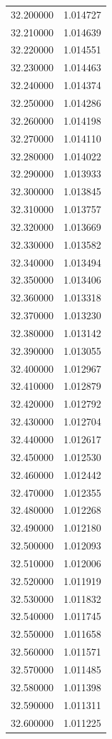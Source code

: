 \begin{tabular}{rr}
32.200000 & 1.014727 \\
32.210000 & 1.014639 \\
32.220000 & 1.014551 \\
32.230000 & 1.014463 \\
32.240000 & 1.014374 \\
32.250000 & 1.014286 \\
32.260000 & 1.014198 \\
32.270000 & 1.014110 \\
32.280000 & 1.014022 \\
32.290000 & 1.013933 \\
32.300000 & 1.013845 \\
32.310000 & 1.013757 \\
32.320000 & 1.013669 \\
32.330000 & 1.013582 \\
32.340000 & 1.013494 \\
32.350000 & 1.013406 \\
32.360000 & 1.013318 \\
32.370000 & 1.013230 \\
32.380000 & 1.013142 \\
32.390000 & 1.013055 \\
32.400000 & 1.012967 \\
32.410000 & 1.012879 \\
32.420000 & 1.012792 \\
32.430000 & 1.012704 \\
32.440000 & 1.012617 \\
32.450000 & 1.012530 \\
32.460000 & 1.012442 \\
32.470000 & 1.012355 \\
32.480000 & 1.012268 \\
32.490000 & 1.012180 \\
32.500000 & 1.012093 \\
32.510000 & 1.012006 \\
32.520000 & 1.011919 \\
32.530000 & 1.011832 \\
32.540000 & 1.011745 \\
32.550000 & 1.011658 \\
32.560000 & 1.011571 \\
32.570000 & 1.011485 \\
32.580000 & 1.011398 \\
32.590000 & 1.011311 \\
32.600000 & 1.011225 \\

\end{tabular}
